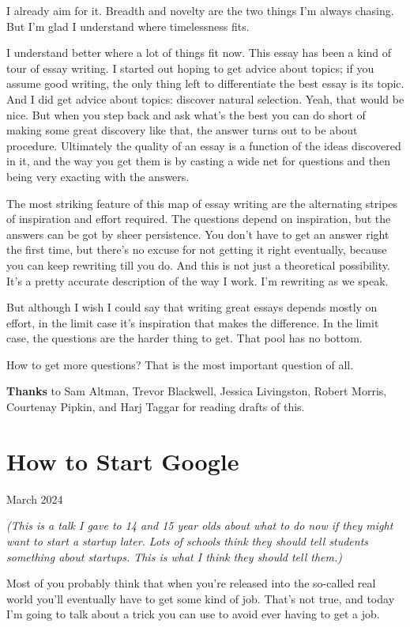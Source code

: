 \documentclass[12pt]{book}
\begin{document}
I already aim for it. Breadth and novelty are the two things I'm always
chasing. But I'm glad I understand where timelessness fits.

I understand better where a lot of things fit now. This essay has been a
kind of tour of essay writing. I started out hoping to get advice about
topics; if you assume good writing, the only thing left to differentiate
the best essay is its topic. And I did get advice about topics: discover
natural selection. Yeah, that would be nice. But when you step back and
ask what's the best you can do short of making some great discovery like
that, the answer turns out to be about procedure. Ultimately the quality
of an essay is a function of the ideas discovered in it, and the way you
get them is by casting a wide net for questions and then being very
exacting with the answers.

The most striking feature of this map of essay writing are the
alternating stripes of inspiration and effort required. The questions
depend on inspiration, but the answers can be got by sheer persistence.
You don't have to get an answer right the first time, but there's no
excuse for not getting it right eventually, because you can keep
rewriting till you do. And this is not just a theoretical possibility.
It's a pretty accurate description of the way I work. I'm rewriting as
we speak.

But although I wish I could say that writing great essays depends mostly
on effort, in the limit case it's inspiration that makes the difference.
In the limit case, the questions are the harder thing to get. That pool
has no bottom.

How to get more questions? That is the most important question of all.


\textbf{Thanks} to Sam Altman, Trevor Blackwell, Jessica Livingston,
Robert Morris, Courtenay Pipkin, and Harj Taggar for reading drafts of
this.
\chapter{How to Start Google}

March 2024

\emph{(This is a talk I gave to 14 and 15 year olds about what to do now
if they might want to start a startup later. Lots of schools think they
should tell students something about startups. This is what I think they
should tell them.)}

Most of you probably think that when you're released into the so-called
real world you'll eventually have to get some kind of job. That's not
true, and today I'm going to talk about a trick you can use to avoid
ever having to get a job.
\end{document}
